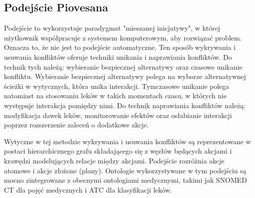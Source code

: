 \subsection{Podejście Piovesana}
Podejście to wykorzystuje paradygmat "mieszanej inicjatywy", w której użytkownik współpracuje z systemem komputerowym, aby rozwiązać problem.\cite{Piovesan} Oznacza to, że nie jest to podejście automatyczne. Ten sposób wykrywania i usuwania konfliktów oferuje techniki unikania i naprawiania konfliktów. Do technik tych należą: wybieranie bezpiecznej alternatywy oraz czasowe unikanie konfliktu. Wybieranie bezpiecznej alternatywy polega na wyborze alternatywnej ścieżki w wytycznych, która unika interakcji. Tymczasowe unikanie polega natomiast na stosowaniu leków w takich momentach czasu, w których nie występuje interakcja pomiędzy nimi. Do technik naprawiania konfliktów należą: modyfikacja dawek leków, monitorowanie efektów oraz osłabianie interakcji poprzez rozszerzenie zaleceń o dodatkowe akcje. 

Wytyczne w tej metodzie wykrywania i usuwania konfliktów są reprezentowane w postaci hierarchicznego grafu składającego się z węzłów będących akcjami i krawędzi modelujących relacje między akcjami. Podejście rozróżnia akcje atomowe i akcje złożone (plany). Ontologie wykorzystywane w tym podejściu są mocno zintegrowane z obecnymi ontologiami medycznymi, takimi jak SNOMED CT dla pojęć medycznych i ATC dla klasyfikacji leków.



